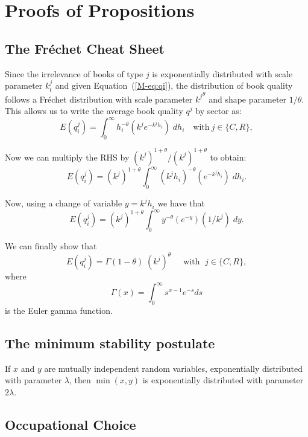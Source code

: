 \clearpage
\section{Proofs of Propositions}\label{appendix:proofs}


\subsection{The Fr\'echet Cheat Sheet}\label{app:frechet}

Since the irrelevance of books of type $j$ is exponentially distributed  with scale parameter $k_{t}^j$ and given Equation~(\ref{M-eq:qi}), the distribution of book quality follows a Fr\'echet distribution with scale parameter ${k^j}^\theta$ and shape parameter $1/\theta$. This allows us to write the average book quality $q^j$ by sector as:
\begin{equation*}
E(q^j_i)=\int_0^\infty h^{-\theta}_i (k^j e^{-k^j h_i})\;dh_i\quad \text{with} \ j\in \{C,R\},
\end{equation*}

Now we can multiply the RHS by $(k^j)^{1+\theta}/(k^j)^{1+\theta}$ to obtain:
\begin{equation*}
E(q^j_i)=(k^j)^{1+\theta}\int_0^\infty (k^j h_i)^{-\theta} ( e^{-k^j h_i})\;dh_i.
\end{equation*}

Now, using a change of variable $y=k^j h_i$ we have that
\begin{equation*}
E(q^j_i)=(k^j)^{1+\theta} \int_0^\infty y^{-\theta} \left( e^{-y}\right)( 1/k^j)\;dy.
\end{equation*}

We can finally show that
$$
E(q^j_i)=\Gamma(1-\theta)\;(k^j)^{\theta}\;\;\;\; \mbox{ with } \; j\in \{C,R\},
$$
where $$\Gamma(x)=\int_0^\infty s^{x-1} e^{-s}ds$$ is the Euler gamma function.

\subsection{The minimum stability postulate}\label{app:min}

If $x$ and $y$ are mutually independent random variables, exponentially distributed with parameter $\lambda$, then $\min(x,y)$ is exponentially distributed with parameter $2\lambda$.


\clearpage
\subsection{Occupational Choice}\label{app:oc_ch}

